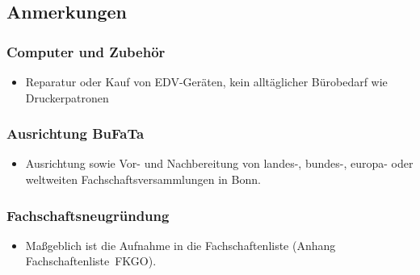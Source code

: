 \documentclass{article}
\begin{document}
    \subsection{Anmerkungen}
        \subsubsection{Computer und Zubehör}
            \begin{itemize}
                \item  Reparatur oder Kauf von EDV-Geräten, kein alltäglicher Bürobedarf wie Druckerpatronen
            \end{itemize}
        \subsubsection{Ausrichtung BuFaTa}
            \begin{itemize}
                \item  Ausrichtung sowie Vor- und Nachbereitung von landes-, bundes-, europa- oder weltweiten Fachschaftsversammlungen in Bonn.
            \end{itemize}
        \subsubsection{Fachschaftsneugründung}
            \begin{itemize}
                \item Maßgeblich ist die Aufnahme in die Fachschaftenliste (Anhang \glqq Fachschaftenliste\grqq\ FKGO).
            \end{itemize}

\pagebreak
\end{document}
